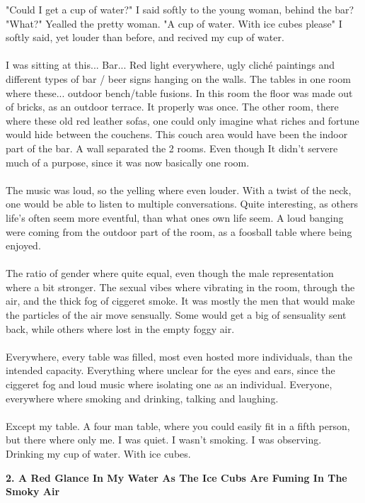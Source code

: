 \documentclass[]{article}
\begin{document}
"Could I get a cup of water?" I said softly to the young woman, behind the bar?
"What?" Yealled the pretty woman.
"A cup of water. With ice cubes please" I softly said, yet louder than before, and recived my cup of water.
\\ \\
I was sitting at this... Bar... Red light everywhere, ugly cliché paintings and different types of bar / beer signs hanging on the walls. The tables in one room where these... outdoor bench/table fusions. In this room the floor was made out of bricks, as an outdoor terrace. It properly was once. The other room, there where these old red leather sofas, one could only imagine what riches and fortune would hide between the couchens. This couch area would have been the indoor part of the bar. A wall separated the 2 rooms. Even though It didn't  servere much of a purpose, since it was now basically one room.
\\ \\
The music was loud, so the yelling where even louder. With a twist of the neck, one would be able to listen to multiple conversations. Quite interesting, as others life's often seem more eventful, than what ones own life seem. A loud banging were coming from the outdoor part of the room, as a foosball table where being enjoyed. 
\\ \\
The ratio of gender where quite equal, even though the male representation where a bit stronger. The sexual vibes where vibrating in the room, through the air, and the thick fog of ciggeret smoke. It was mostly the men that would make the particles of the air move sensually. Some would get a big of sensuality sent back, while others where lost in the empty foggy air. 
\\ \\
Everywhere, every table was filled, most even hosted more individuals, than the intended capacity. Everything where unclear for the eyes and ears, since the ciggeret fog and loud music where isolating one as an individual. Everyone, everywhere where smoking and drinking, talking and laughing.
\\ \\
Except my table. A four man table, where you could easily fit in a fifth person, but there where only me. I was quiet. I wasn't smoking. I was observing. Drinking my cup of water. With ice cubes.

\newpage

\begin{center}
\large\textbf{2. A Red Glance In My Water As \newline The Ice Cubs Are Fuming In The Smoky Air}
\end{center}
\end{document}
